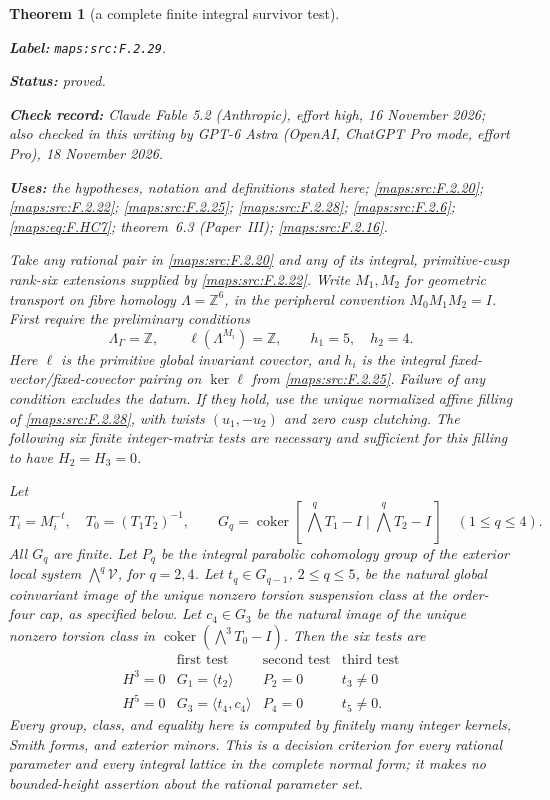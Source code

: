 \documentclass[11pt,a4paper]{article}
\newtheorem{theorem}{Theorem}[section]
\theoremstyle{definition}
\newcommand{\StatementRecord}[4]{\par\smallskip\begingroup\upshape\raggedright\noindent\textbf{Label:} \nolinkurl{#1}.\par\noindent\textbf{Status:} #2.\par\noindent\textbf{Check record:} #3.\par\noindent\textbf{Uses:} #4.\par\endgroup\smallskip}
\newcommand{\CurrentChecker}{GPT-6 Astra (OpenAI, ChatGPT Pro mode, effort Pro), 18 November 2026}
\newcommand{\ExternalPaperRef}[3]{\ifmmode\text{\upshape #1#2 (Paper~#3)}\else #1#2 (Paper~#3)\fi}
\begin{document}
\begin{theorem}[a complete finite integral survivor test]\label{maps:src:F.2.29}
\StatementRecord{maps:src:F.2.29}{proved}{Claude Fable 5.2 (Anthropic), effort high, 16 November 2026; also checked in this writing by \CurrentChecker}{the hypotheses, notation and definitions stated here; \cref{maps:src:F.2.20}; \cref{maps:src:F.2.22}; \cref{maps:src:F.2.25}; \cref{maps:src:F.2.28}; \cref{maps:src:F.2.6}; \cref{maps:eq:F.HC7}; \ExternalPaperRef{theorem~}{6.3}{III}; \cref{maps:src:F.2.16}}


Take any rational pair in \ref{maps:src:F.2.20} and any of its integral,
primitive-cusp rank-six extensions supplied by \ref{maps:src:F.2.22}.
Write $M_1,M_2$ for geometric transport on fibre homology
$\Lambda=\mathbb Z^6$, in the peripheral convention
$M_0M_1M_2=I$.
First require the preliminary conditions
\[
 \Lambda_\Gamma=\mathbb Z,\qquad
 \ell(\Lambda^{M_i})=\mathbb Z,\qquad h_1=5,\quad h_2=4 .
 \tag{F.HC1}\label{maps:eq:F.HC1}
\]
Here $\ell$ is the primitive global invariant covector, and
$h_i$ is the integral fixed-vector/fixed-covector pairing
on $\ker\ell$ from \ref{maps:src:F.2.25}.
Failure of any condition excludes the datum.
If they hold, use the unique normalized affine filling of
\ref{maps:src:F.2.28}, with twists $(u_1,-u_2)$ and zero cusp clutching.
The following six finite integer-matrix tests are necessary
and sufficient for this filling to have $H_2=H_3=0$.

Let
\[
 T_i=M_i^{-t},\quad T_0=(T_1T_2)^{-1},\qquad
 G_q=\operatorname{coker}
 [\,\bigwedge^qT_1-I\mid\bigwedge^qT_2-I\,]
 \quad(1\le q\le4).
 \tag{F.HC2}\label{maps:eq:F.HC2}
\]
All $G_q$ are finite.  Let $P_q$ be the integral parabolic
cohomology group of the exterior local system
$\bigwedge^q\mathcal V$, for $q=2,4$.
Let $t_q\in G_{q-1}$, $2\le q\le5$, be the natural global
coinvariant image of the unique nonzero torsion suspension
class at the order-four cap, as specified below.
Let $c_4\in G_3$ be the natural image of the unique nonzero
torsion class in
$\operatorname{coker}(\bigwedge^3T_0-I)$.
Then the six tests are
\[
\begin{array}{c|ccc}
 &\text{first test}&\text{second test}&\text{third test}\\ \hline
 H^3=0&G_1=\langle t_2\rangle&P_2=0&t_3\ne0\\
 H^5=0&G_3=\langle t_4,c_4\rangle&P_4=0&t_5\ne0 .
\end{array}
\tag{F.HC3}\label{maps:eq:F.HC3}
\]
Every group, class, and equality here is computed by
finitely many integer kernels, Smith forms, and exterior
minors.  This is a decision criterion for every rational
parameter and every integral lattice in the complete
normal form; it makes no bounded-height assertion about
the rational parameter set.

\end{theorem}
\end{document}
